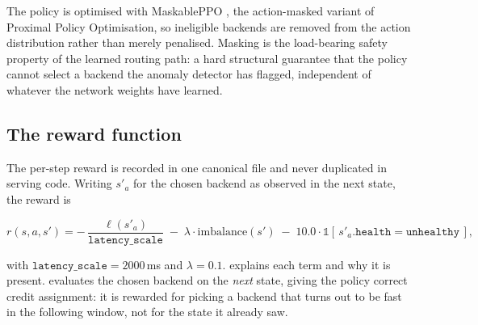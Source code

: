 The policy is optimised with MaskablePPO \cite{schulman2017ppo, raffin2021sb3},
the action-masked variant of Proximal Policy Optimisation, so ineligible backends
are removed from the action distribution rather than merely penalised. Masking is
the load-bearing safety property of the learned routing path: a hard structural
guarantee that the policy cannot select a backend the anomaly detector has flagged,
independent of whatever the network weights have learned.

\subsection{The reward function}\label{imb:ppo_reward}

The per-step reward is recorded in one canonical file and never duplicated in
serving code. Writing $s'_a$ for the chosen backend as observed in the next state,
the reward is

\begin{equation}\label{imb:eq:reward}
  r(s, a, s') =
  -\,\frac{\ell(s'_a)}{\texttt{latency\_scale}}
  \;-\; \lambda \cdot \mathrm{imbalance}(s')
  \;-\; 10.0 \cdot \mathbb{1}[\,s'_a.\texttt{health} = \texttt{unhealthy}\,],
\end{equation}

with $\texttt{latency\_scale}=2000$\,ms and $\lambda=0.1$. 
explains each term and why it is present.  evaluates the chosen
backend on the \emph{next} state, giving the policy correct credit assignment: it
is rewarded for picking a backend that turns out to be fast in the following
window, not for the state it already saw.

